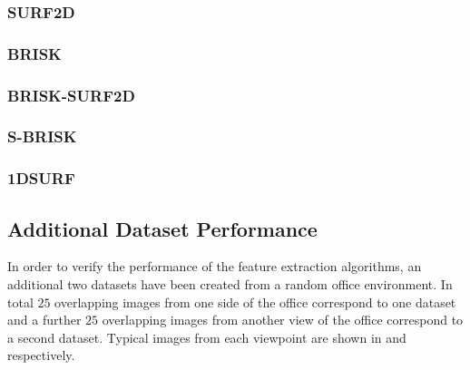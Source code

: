 \documentclass{article}
\begin{document}
\subsubsection{SURF2D}
\label{sec:2dsurfResults}


\subsubsection{BRISK}
\label{sec:briskResults}


\subsubsection{BRISK-SURF2D}
\label{sec:brisk2dsurfResults}


\subsubsection{S-BRISK}
\label{sec:sbriskResults}



\subsubsection{1DSURF}
\label{sec:1dsurfResults}





\subsection{Additional Dataset Performance}
\label{sec:additionalDataset}
In order to verify the performance of the feature extraction algorithms, an additional two datasets have been created from a random office environment. In total $25$ overlapping images from one side of the office correspond to one dataset and a further $25$ overlapping images from another view of the office correspond to a second dataset. Typical images from each viewpoint are shown in  and  respectively.\\
\end{document}
